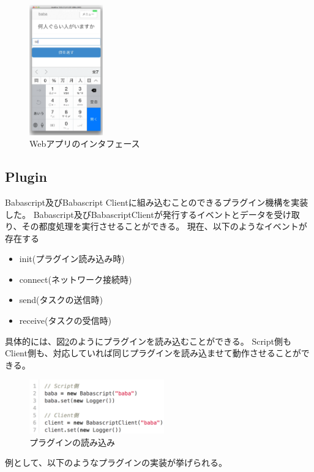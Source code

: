 \begin{figure}[h]
  \centering
  \includegraphics[width=120px]{./images/interface.png}
  \caption{Webアプリのインタフェース}
  \label{webapp-interface}
\end{figure}

\subsection{Plugin}\label{plugin}

Babascript及びBabascript
Clientに組み込むことのできるプラグイン機構を実装した。
Babascript及びBabascriptClientが発行するイベントとデータを受け取り、その都度処理を実行させることができる。
現在、以下のようなイベントが存在する

\begin{itemize}
\itemsep1pt\parskip0pt
\item
  init(プラグイン読み込み時)
\item
  connect(ネットワーク接続時)
\item
  send(タスクの送信時)
\item
  receive(タスクの受信時)
\end{itemize}

具体的には、図\ref{plugin}のようにプラグインを読み込むことができる。
Script側もClient側も、対応していれば同じプラグインを読み込ませて動作させることができる。

\begin{figure}[h]
  \centering
  \includegraphics[width=220px]{./images/plugin.png}
  \caption{プラグインの読み込み}
  \label{plugin}
\end{figure}

例として、以下のようなプラグインの実装が挙げられる。

